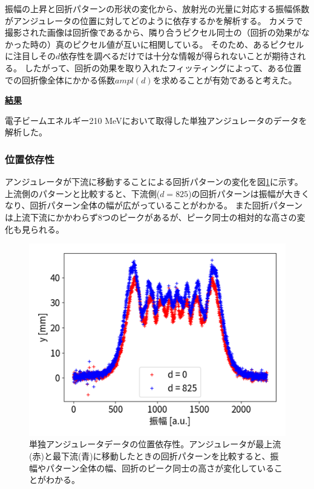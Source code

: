 \documentclass[a4paper,11pt,uplatex]{jsbook}
\begin{document}
振幅の上昇と回折パターンの形状の変化から、放射光の光量に対応する振幅係数がアンジュレータの位置に対してどのように依存するかを解析する。
カメラで撮影された画像は回折像であるから、隣り合うピクセル同士の（回折の効果がなかった時の）真のピクセル値が互いに相関している。
そのため、あるピクセルに注目しその$d$依存性を調べるだけでは十分な情報が得られないことが期待される。
したがって、回折の効果を取り入れたフィッティングによって、ある位置での回折像全体にかかる係数$ampl(d)$を求めることが有効であると考えた。

\noindent \textbf{\underline{結果}}\par
電子ビームエネルギー210 MeVにおいて取得した単独アンジュレータのデータを解析した。
\subsubsection{位置依存性}
アンジュレータが下流に移動することによる回折パターンの変化を図\ref{DCposdep}に示す。上流側のパターンと比較すると、下流側($d= 825$)の回折パターンは振幅が大きくなり、回折パターン全体の幅が広がっていることがわかる。
また回折パターンは上流下流にかかわらず8つのピークがあるが、ピーク同士の相対的な高さの変化も見られる。
\begin{figure}[H]
  \centering
  \includegraphics[width=0.8\linewidth]{image/4-DCposdep.png}
  \caption[アンジュレータ位置依存性]{単独アンジュレータデータの位置依存性。アンジュレータが最上流(赤)と最下流(青)に移動したときの回折パターンを比較すると、振幅やパターン全体の幅、回折のピーク同士の高さが変化していることがわかる。}\label{DCposdep}
\end{figure}
\end{document}
